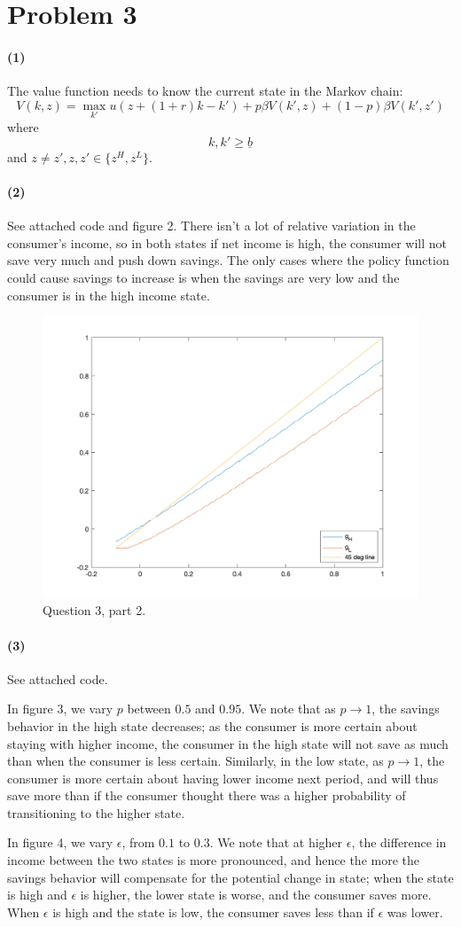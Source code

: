 \documentclass[10pt,letter]{article}
\newcommand{\problem}[1]{\section*{Problem #1}}
\newcommand{\problempart}[1]{\paragraph{#1}}
\begin{document}
\pagebreak
\problem{3}

\problempart{(1)}
The value function needs to know the current state in the Markov chain:
\[ V(k, z) = \max_{k'} u(z + (1+r)k - k') + p \beta V(k', z) + (1-p) \beta V(k', z') \]
where
\[ k, k' \ge \underline{b} \]
and $z \neq z', z, z' \in \{ z^H, z^L \}$.
\problempart{(2)}
See attached code and figure 2. There isn't a lot of relative variation in the consumer's income, so in both states if net income is high, the consumer will not save very much and push down savings. The only cases where the policy function could cause savings to increase is when the savings are very low and the consumer is in the high income state.
\begin{figure}
\centering
\includegraphics[scale=0.8]{ps5q3p2}
\caption{Question 3, part 2.}
\end{figure}
\problempart{(3)}
See attached code.

In figure 3, we vary $p$ between $0.5$ and $0.95$. We note that as $p \to 1$, the savings behavior in the high state decreases; as the consumer is more certain about staying with higher income, the consumer in the high state will not save as much than when the consumer is less certain. Similarly, in the low state, as $p \to 1$, the consumer is more certain about having lower income next period, and will thus save more than if the consumer thought there was a higher probability of transitioning to the higher state.

In figure 4, we vary $\epsilon$, from $0.1$ to $0.3$. We note that at higher $\epsilon$, the difference in income between the two states is more pronounced, and hence the more the savings behavior will compensate for the potential change in state; when the state is high and $\epsilon$ is higher, the lower state is worse, and the consumer saves more. When $\epsilon$ is high and the state is low, the consumer saves less than if $\epsilon$ was lower.
\end{document}

